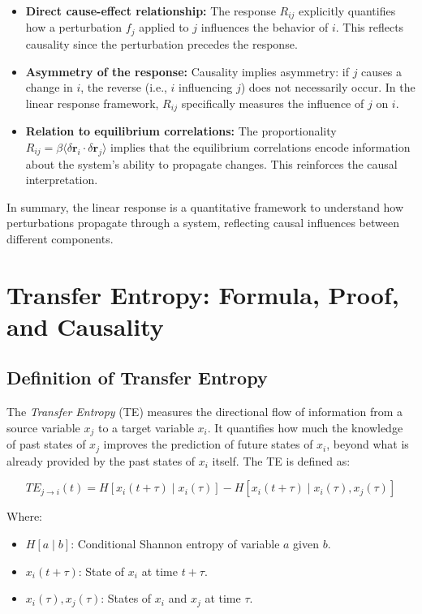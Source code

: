 \documentclass[English, Lau, oneside]{sapthesis}
\begin{document}
\begin{itemize}
\begin{itemize}
    \item \textbf{Direct cause-effect relationship:} The response \(R_{ij}\) explicitly quantifies how a perturbation \(f_j\) applied to \(j\) influences the behavior of \(i\). This reflects causality since the perturbation precedes the response.
    \item \textbf{Asymmetry of the response:} Causality implies asymmetry: if \(j\) causes a change in \(i\), the reverse (i.e., \(i\) influencing \(j\)) does not necessarily occur. In the linear response framework, \(R_{ij}\) specifically measures the influence of \(j\) on \(i\).
    \item \textbf{Relation to equilibrium correlations:} The proportionality \(R_{ij} = \beta \langle \delta \mathbf{r}_i \cdot \delta \mathbf{r}_j \rangle\) implies that the equilibrium correlations encode information about the system's ability to propagate changes. This reinforces the causal interpretation.
\end{itemize}

In summary, the linear response is a quantitative framework to understand how perturbations propagate through a system, reflecting causal influences between different components.
\section*{Transfer Entropy: Formula, Proof, and Causality}

\subsection*{Definition of Transfer Entropy}
The \textit{Transfer Entropy} (TE) measures the directional flow of information from a source variable \(x_j\) to a target variable \(x_i\). It quantifies how much the knowledge of past states of \(x_j\) improves the prediction of future states of \(x_i\), beyond what is already provided by the past states of \(x_i\) itself. The TE is defined as:

\[
TE_{j \to i}(t) = H[x_i(t + \tau) \mid x_i(\tau)] - H[x_i(t + \tau) \mid x_i(\tau), x_j(\tau)]
\]

Where:
\begin{itemize}
    \item \(H[a \mid b]\): Conditional Shannon entropy of variable \(a\) given \(b\).
    \item \(x_i(t + \tau)\): State of \(x_i\) at time \(t + \tau\).
    \item \(x_i(\tau), x_j(\tau)\): States of \(x_i\) and \(x_j\) at time \(\tau\).
\end{itemize}


\end{itemize}
\end{document}
